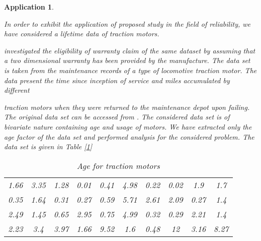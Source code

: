 \documentclass[11pt,a4paper]{article}
\numberwithin{equation}{section}
\newtheorem{application}{Application}[section]
\begin{document}
	\begin{application}\label{real2}

		In order to exhibit the application of proposed study in the field of reliability, we have considered a lifetime data of traction motors.

		\cite{jung2007analysis} investigated the eligibility of warranty claim of the same dataset  by assuming that a two dimensional warranty has been provided by the manufacture. The data set is taken from the maintenance records of a type of locomotive traction motor. The data present the time since inception of service and miles accumulated by different

		traction motors when they were returned to the maintenance depot upon failing. The original data set can be accessed from \cite{eliashberg1997calculating}. The considered data set is of bivariate nature containing age and usage of motors.  We have extracted only the age factor of the data set and performed analysis for the considered problem. The data set is given in Table [\ref{tab:realdata2}]

		

		\begin{table}[htbp]

			\centering

			\caption{Age for traction motors}

			

			\begin{tabular}{cccccccccc}

				\toprule

				1.66  & 3.35  & 1.28  & 0.01  & 0.41  & 4.98  & 0.22  & 0.02  & 1.9   & 1.7 \\

				0.35  & 1.64  & 0.31  & 0.27  & 0.59  & 5.71  & 2.61  & 2.09  & 0.27  & 1.4 \\

				2.49  & 1.45  & 0.65  & 2.95  & 0.75  & 4.99  & 0.32  & 0.29  & 2.21  & 1.4 \\

				2.23  & 3.4   & 3.97  & 1.66  & 9.52  & 1.6   & 0.48  & 12    & 3.16  & 8.27 \\

				\bottomrule

			\end{tabular}%

			\label{tab:realdata2}%

		\end{table}%

	\end{application}
\end{document}
